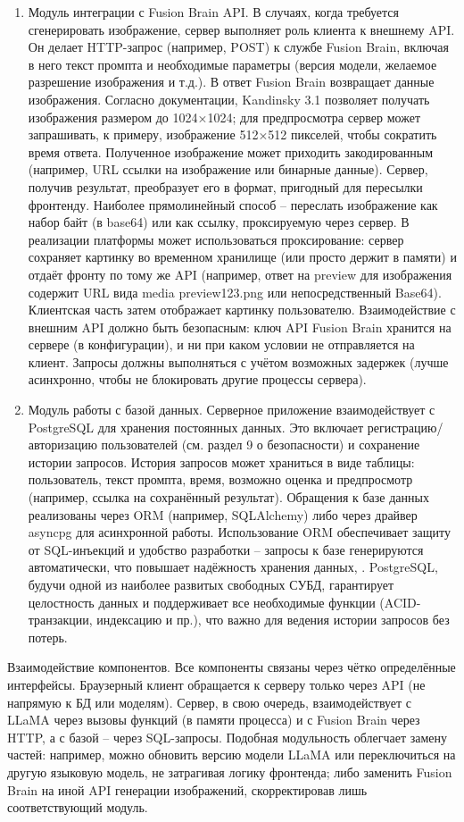 \begin{enumerate}[label=\arabic*.]
    \item Модуль интеграции с Fusion Brain API. В случаях, когда требуется сгенерировать изображение, сервер выполняет роль клиента к внешнему API. Он делает HTTP-запрос (например, POST) к службе Fusion Brain, включая в него текст промпта и необходимые параметры (версия модели, желаемое разрешение изображения и т.д.). В ответ Fusion Brain возвращает данные изображения. Согласно документации, Kandinsky 3.1 позволяет получать изображения размером до 1024×1024; для предпросмотра сервер может запрашивать, к примеру, изображение 512×512 пикселей, чтобы сократить время ответа\cite{fusionbrain:docs}. Полученное изображение может приходить закодированным (например, URL ссылки на изображение или бинарные данные). Сервер, получив результат, преобразует его в формат, пригодный для пересылки фронтенду. Наиболее прямолинейный способ – переслать изображение как набор байт (в base64) или как ссылку, проксируемую через сервер. В реализации платформы может использоваться проксирование: сервер сохраняет картинку во временном хранилище (или просто держит в памяти) и отдаёт фронту по тому же API (например, ответ на preview для изображения содержит URL вида media preview123.png или непосредственный Base64). Клиентская часть затем отображает картинку пользователю. Взаимодействие с внешним API должно быть безопасным: ключ API Fusion Brain хранится на сервере (в конфигурации), и ни при каком условии не отправляется на клиент. Запросы должны выполняться с учётом возможных задержек (лучше асинхронно, чтобы не блокировать другие процессы сервера).
    \item Модуль работы с базой данных. Серверное приложение взаимодействует с PostgreSQL для хранения постоянных данных. Это включает регистрацию/авторизацию пользователей (см. раздел 9 о безопасности) и сохранение истории запросов. История запросов может храниться в виде таблицы: пользователь, текст промпта, время, возможно оценка и предпросмотр (например, ссылка на сохранённый результат). Обращения к базе данных реализованы через ORM (например, SQLAlchemy) либо через драйвер asyncpg для асинхронной работы. Использование ORM обеспечивает защиту от SQL-инъекций и удобство разработки – запросы к базе генерируются автоматически, что повышает надёжность хранения данных\cite{postgresql:skillfactory}, \cite{postgresql:wiki}. PostgreSQL, будучи одной из наиболее развитых свободных СУБД, гарантирует целостность данных и поддерживает все необходимые функции (ACID-транзакции, индексацию и пр.), что важно для ведения истории запросов без потерь. 
\end{enumerate}
Взаимодействие компонентов. Все компоненты связаны через чётко определённые интерфейсы. Браузерный клиент обращается к серверу только через API (не напрямую к БД или моделям). Сервер, в свою очередь, взаимодействует с LLaMA через вызовы функций (в памяти процесса) и с Fusion Brain через HTTP, а с базой – через SQL-запросы. Подобная модульность облегчает замену частей: например, можно обновить версию модели LLaMA или переключиться на другую языковую модель, не затрагивая логику фронтенда; либо заменить Fusion Brain на иной API генерации изображений, скорректировав лишь соответствующий модуль.

